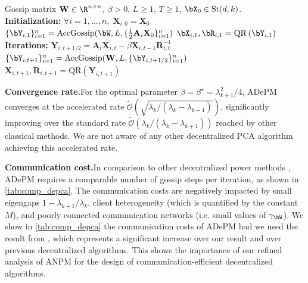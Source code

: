 \documentclass{article}
\theoremstyle{plain}
\theoremstyle{definition}
\theoremstyle{remark}
\begin{document}
\begin{algorithm}[t]
    \caption{ADePM}
    \label{alg:adepm}
    \begin{algorithmic}[1]
        \REQUIRE Gossip matrix $\mathbf{W} \in \R^{n\times n}$, $\beta > 0$, $L \geqslant 1$, $T\geqslant 1$, $\bX_0\in\mathrm{St}(d,k)$.
        \\\textbf{Initialization:}
        \STATE $\forall i=1,\dots,n, \; \mathbf{X}_{i,0} = \mathbf{X}_0$
        \STATE $\{\bY_{i,1}\}_{i=1}^n = \mathrm{AccGossip}(\bW, L, \{\frac{1}{2}\mathbf{A}_i \mathbf{X}_{0}\}_{i=1}^n)$
          \STATE $\bX_{i,1}, \bR_{i,1} = \mathrm{QR}\left(\bY_{i,1}\right)$
        \ENDFOR        
        \\\textbf{Iterations:}
                \STATE $\mathbf{Y}_{i,t+1/2} = \mathbf{A}_i \mathbf{X}_{i,t} - \beta \mathbf{X}_{i,t-1}\mathbf{R}_{i,t}^{-1}$
            \ENDFOR
            \STATE $\{\bY_{i,t+1}\}_{i=1}^n = \mathrm{AccGossip}(\mathbf{W}, L, \{\bY_{i,t+1/2}\}_{i=1}^n)$
                \STATE $\mathbf{X}_{i,t+1}, \mathbf{R}_{i,t+1} = \mathrm{QR}(\mathbf{Y}_{i,t+1})$
            \ENDFOR
        \ENDFOR
    \end{algorithmic}
\end{algorithm}




\textbf{Convergence rate.}\quad For the optimal parameter $\beta =\beta^\star = \lambda_{k+1}^2/4$, ADePM converges at the accelerated rate $\tilde{\mathcal{O}}(\sqrt{\lambda_k/(\lambda_k - \lambda_{k+1})})$, significantly improving over the standard rate $\tilde{\mathcal{O}}(\lambda_k/(\lambda_k - \lambda_{k+1}))$ reached by other classical methods. We are not aware of any other decentralized PCA algorithm achieving this accelerated rate.

\textbf{Communication cost.}\quad In comparison to other decentralized power methods \cite{wai17,ye21}, ADePM requires a comparable number of gossip steps per iteration, as shown in \cref{tab:comp_depca}. The communication costs are negatively impacted by small eigengaps $1 - \lambda_{k+1}/\lambda_k$, client heterogeneity (which is quantified by the constant $M$), and poorly connected communication networks (i.e. small values of $\gamma_\bW$). We show in \cref{tab:comp_depca} the communication costs of ADePM had we used the result from \citet{xu2023anpm}, which represents a significant increase over our result and over previous decentralized algorithms. This shows the importance of our refined analysis of ANPM for the design of communication-efficient decentralized algorithms.
\end{document}
